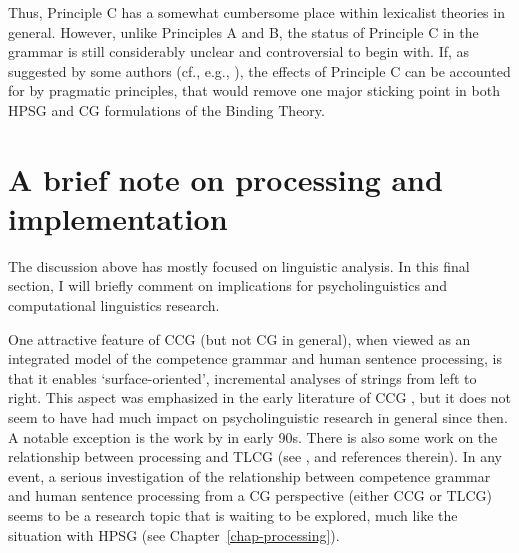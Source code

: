 \documentclass[output=paper]{langsci/langscibook}
\begin{document}

Thus, Principle C has a somewhat cumbersome place within lexicalist
theories in general. However, unlike Principles A and B, the status of
Principle C in the grammar is still considerably unclear and
controversial to begin with. If, as suggested by some authors (cf.,
e.g., \citet{levinson87,levinson91}), the effects of Principle C can be accounted
for by pragmatic principles, that would remove one major sticking
point in both HPSG and CG formulations of the Binding Theory.


\section{A brief note on processing and implementation}

The discussion above has mostly focused on linguistic analysis. In
this final section, I will briefly comment on implications for
psycholinguistics and computational linguistics research.

One attractive feature of CCG (but not CG in general), when viewed as
an integrated model of the competence grammar and human sentence
processing, is that it enables `surface-oriented', incremental
analyses of strings from left to right. This aspect was emphasized in
the early literature of CCG \citep{AS82a,CS85a}, but it does not seem to
have had much impact on psycholinguistic research in general since
then. A notable exception is the work by \citet{pickering-barry91,PB93a} in
early 90s. There is also some work on the relationship between processing
and TLCG (see \cite[Chapters 9 and 10]{morrill2011}, and references
therein). In any event, a serious investigation of the relationship
between competence grammar and human sentence processing from a CG
perspective (either CCG or TLCG) seems to be a research topic that
is waiting to be explored, much like the situation with HPSG
(see Chapter~\ref{chap-processing}).
\end{document}

